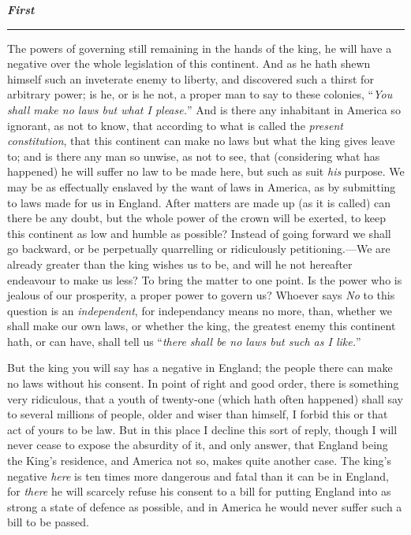 \documentclass[12pt, twocolumn]{book}
\begin{document}
    {\begin{adjustwidth}{1.2em}{1.2em} \small

        \textit{\textbf{First}}
        \noindent \rule{40pt}{0.5pt}

        The powers of governing still remaining in the hands of the king, he will have a negative over the whole legislation of this continent. And as he hath shewn himself such an inveterate enemy to liberty, and discovered such a thirst for arbitrary power; is he, or is he not, a proper man to say to these colonies, “\textit{You shall make no laws but what I please.}” And is there any inhabitant in America so ignorant, as not to know, that according to what is called the \textit{present constitution}, that this continent can make no laws but what the king gives leave to; and is there any man so unwise, as not to see, that (considering what has happened) he will suffer no law to be made here, but such as suit \textit{his} purpose. We may be as effectually enslaved by the want of laws in America, as by submitting to laws made for us in England. After matters are made up (as it is called) can there be any doubt, but the whole power of the crown will be exerted, to keep this continent as low and humble as possible? Instead of going forward we shall go backward, or be perpetually quarrelling or ridiculously petitioning.—We are already greater than the king wishes us to be, and will he not hereafter endeavour to make us less? To bring the matter to one point. Is the power who is jealous of our prosperity, a proper power to govern us? Whoever says \textit{No} to this question is an \textit{independent}, for independancy means no more, than, whether we shall make our own laws, or whether the king, the greatest enemy this continent hath, or can have, shall tell us “\textit{there shall be no laws but such as I like.}”

    \end{adjustwidth}}

    But the king you will say has a negative in England; the people there can make no laws without his consent. In point of right and good order, there is something very ridiculous, that a youth of twenty-one (which hath often happened) shall say to several millions of people, older and wiser than himself, I forbid this or that act of yours to be law. But in this place I decline this sort of reply, though I will never cease to expose the absurdity of it, and only answer, that England being the King’s residence, and America not so, makes quite another case. The king’s negative \textit{here} is ten times more dangerous and fatal than it can be in England, for \textit{there} he will scarcely refuse his consent to a bill for putting England into as strong a state of defence as possible, and in America he would never suffer such a bill to be passed.
\end{document}
